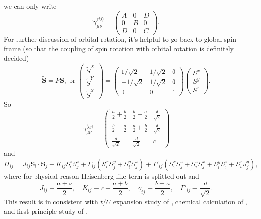 \documentclass[10pt,nofootinbib]{revtex4}
\begin{document}
		\noindent we can only write
		\begin{equation}\label{2.1.4}
			\widetilde{\gamma}_{\mu\nu}^{\langle ij \rangle }=\left(\begin{array}{ccc}
				A & 0 & D \\ 0 & B & 0 \\ D & 0 & C
			\end{array}\right).
		\end{equation}
		\indent For further discussion of orbital rotation, it's helpful to go back to global spin frame (so that the coupling of spin rotation with orbital rotation is definitely decided)
		\begin{equation*}
			\widetilde{\bm{S}}=P\bm{S},\text{ or }\left(\begin{array}{c}
				\widetilde{S}^X \\ \widetilde{S}^Y \\ \widetilde{S}^Z
			\end{array}\right)=\left(\begin{array}{ccc}
				1/\sqrt{2} & 1/\sqrt{2} & 0\\-1/\sqrt{2} & 1/\sqrt{2} & 0\\ 0 & 0 & 1
			\end{array}\right) \left(\begin{array}{c}
				S^x \\ S^y \\ S^z
			\end{array}\right).
		\end{equation*}
		So
		\begin{equation}\label{2.1.5}
			\gamma_{\mu\nu}^{\langle ij \rangle }=\left(\begin{array}{ccc}
				\frac{a}{2}+\frac{b}{2} & \frac{b}{2}-\frac{a}{2} & \frac{d}{\sqrt{2}} \\
				\frac{b}{2}-\frac{a}{2} & \frac{a}{2}+\frac{b}{2} & \frac{d}{\sqrt{2}} \\
				\frac{d}{\sqrt{2}} & \frac{d}{\sqrt{2}} & c
			\end{array}\right)
		\end{equation}
		and
		\begin{equation}\label{2.1.6}
			H_{ij}=J_{ij}\bm{S}_i\cdot\bm{S}_j+K_{ij}S_i^zS_j^z+\Gamma_{ij}(S_i^xS_j^y+S_i^yS_j^x)+\Gamma'_{ij}(S_i^xS_j^z+S_i^zS_j^x+S_i^yS_j^z+S_i^zS_j^y),
		\end{equation}
		where for physical reason Heisenberg-like term is splitted out and
		\begin{equation*}
			J_{ij}\equiv\dfrac{a+b}{2},\quad K_{ij}\equiv c-\dfrac{a+b}{2},\quad \gamma_{ij}\equiv\dfrac{b-a}{2},\quad \Gamma'_{ij}\equiv\dfrac{d}{\sqrt{2}}.
		\end{equation*}
		This result is in consistent with $t/U$ expansion study of \cite{rau2014generic}, chemical calculation of \cite{katukuri2014kitaev}, and first-principle study of \cite{hu2015first}. 
\end{document}
